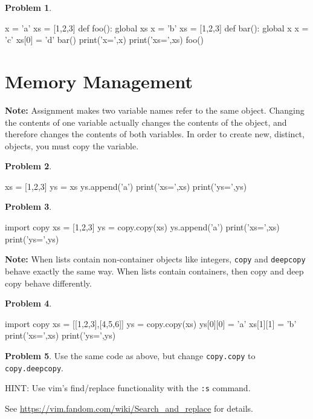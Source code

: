 \documentclass[12pt]{article}
\theoremstyle{definition}
\newtheorem{problem}{Problem}
\begin{document}
\begin{problem}
~~~
\begin{python}
x = 'a'
xs = [1,2,3]
def foo():
    global xs
    x = 'b'
    xs = [1,2,3]
    def bar():
        global x
        x = 'c'
        xs[0] = 'd'
    bar()
    print('x=',x)
    print('xs=',xs)
foo()
\end{python}
\end{problem}

\newpage
\section{Memory Management}
\noindent
\textbf{Note:}
Assignment makes two variable names refer to the same object.
Changing the contents of one variable actually changes the contents of the object,
and therefore changes the contents of both variables.
In order to create new, distinct, objects, you must copy the variable.

\begin{problem}
~~~
\begin{python}
xs = [1,2,3]
ys = xs
ys.append('a')
print('xs=',xs)
print('ys=',ys)
\end{python}
\end{problem}
\vspace{2in}

\begin{problem}
~~~
\begin{python}
import copy
xs = [1,2,3]
ys = copy.copy(xs)
ys.append('a')
print('xs=',xs)
print('ys=',ys)
\end{python}
\end{problem}
\vspace{2in}

\newpage
\noindent
\textbf{Note:}
When lists contain non-container objects like integers, \texttt{copy} and \texttt{deepcopy} behave exactly the same way.
When lists contain containers, then copy and deep copy behave differently.

\begin{problem}
~~~
\begin{python}
import copy
xs = [[1,2,3],[4,5,6]]
ys = copy.copy(xs)
ys[0][0] = 'a'
xs[1][1] = 'b'
print('xs=',xs)
print('ys=',ys)
\end{python}
\end{problem}
\vspace{2in}

\begin{problem}
Use the same code as above, but change \texttt{copy.copy} to \texttt{copy.deepcopy}.

\vspace{0.15in}
\noindent
HINT: Use vim's find/replace functionality with the \texttt{:s} command.

\noindent
See \url{https://vim.fandom.com/wiki/Search_and_replace} for details.
\end{problem}
\vspace{2in}
\end{document}
